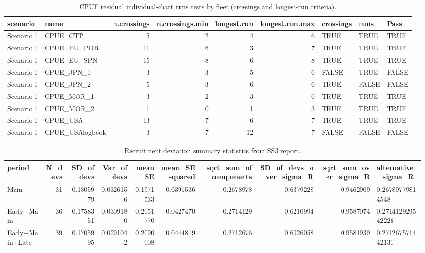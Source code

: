 \begin{table}

\caption{\label{tab:internal-runs-qic}CPUE residual individual-chart runs tests by fleet (crossings and longest-run criteria).}
\centering
\begin{tabular}[t]{llrrrrlll}
\toprule
scenario & name & n.crossings & n.crossings.min & longest.run & longest.run.max & crossings & runs & Pass\\
\midrule
Scenario 1 & CPUE\_CTP & 5 & 2 & 4 & 6 & TRUE & TRUE & TRUE\\
Scenario 1 & CPUE\_EU\_POR & 11 & 6 & 3 & 7 & TRUE & TRUE & TRUE\\
Scenario 1 & CPUE\_EU\_SPN & 15 & 8 & 6 & 8 & TRUE & TRUE & TRUE\\
Scenario 1 & CPUE\_JPN\_1 & 3 & 3 & 5 & 6 & FALSE & TRUE & FALSE\\
Scenario 1 & CPUE\_JPN\_2 & 5 & 3 & 6 & 6 & TRUE & FALSE & FALSE\\
\addlinespace
Scenario 1 & CPUE\_MOR\_1 & 3 & 2 & 3 & 6 & TRUE & TRUE & TRUE\\
Scenario 1 & CPUE\_MOR\_2 & 1 & 0 & 1 & 3 & TRUE & TRUE & TRUE\\
Scenario 1 & CPUE\_USA & 13 & 7 & 6 & 7 & TRUE & TRUE & TRUE\\
Scenario 1 & CPUE\_USAlogbook & 3 & 7 & 12 & 7 & FALSE & FALSE & FALSE\\
\bottomrule
\end{tabular}
\end{table}

\begin{table}

\caption{\label{tab:internal-rec-sigma}Recruitment deviation summary statistics from SS3 report.}
\centering
\begin{tabular}[t]{lrrrrrrrrl}
\toprule
period & N\_devs & SD\_of\_devs & Var\_of\_devs & mean\_SE & mean\_SEsquared & sqrt\_sum\_of\_components & SD\_of\_devs\_over\_sigma\_R & sqrt\_sum\_over\_sigma\_R & alternative\_sigma\_R\\
\midrule
Main & 31 & 0.1805979 & 0.0326156 & 0.1971533 & 0.0391536 & 0.2678978 & 0.6379228 & 0.9462909 & 0.26789779814548\\
Early+Main & 36 & 0.1758351 & 0.0309180 & 0.2051770 & 0.0427470 & 0.2714129 & 0.6210994 & 0.9587074 & 0.271412929542226\\
Early+Main+Late & 39 & 0.1705995 & 0.0291042 & 0.2090008 & 0.0444819 & 0.2712676 & 0.6026058 & 0.9581939 & 0.271267571442131\\
\bottomrule
\end{tabular}
\end{table}

